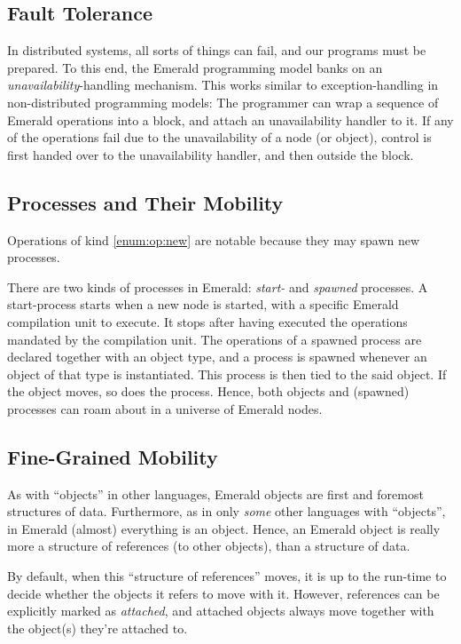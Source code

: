 \subsection{Fault Tolerance}

In distributed systems, all sorts of things can fail, and our programs
must be prepared. To this end, the Emerald programming model banks on
an \emph{unavailability}-handling mechanism. This works similar to
exception-handling in non-distributed programming models: The
programmer can wrap a sequence of Emerald operations into a block, and
attach an unavailability handler to it. If any of the operations fail
due to the unavailability of a node (or object), control is first
handed over to the unavailability handler, and then outside the block.

\subsection{Processes and Their Mobility}

Operations of kind \ref{enum:op:new} are notable because they may
spawn new processes.

There are two kinds of processes in Emerald: \emph{start-} and
\emph{spawned} processes. A start-process starts when a new node is
started, with a specific Emerald compilation unit to execute. It stops
after having executed the operations mandated by the compilation unit.
The operations of a spawned process are declared together with an
object type, and a process is spawned whenever an object of that type
is instantiated.  This process is then tied to the said object. If the
object moves, so does the process. Hence, both objects and (spawned)
processes can roam about in a universe of Emerald nodes.

\subsection{Fine-Grained Mobility}

As with ``objects'' in other languages, Emerald objects are first and
foremost structures of data.  Furthermore, as in only \emph{some}
other languages with ``objects'', in Emerald (almost) everything is an
object. Hence, an Emerald object is really more a structure of
references (to other objects), than a structure of data.

By default, when this ``structure of references'' moves, it is up to
the run-time to decide whether the objects it refers to move with it.
However, references can be explicitly marked as \emph{attached}, and
attached objects always move together with the object(s) they're
attached to.

